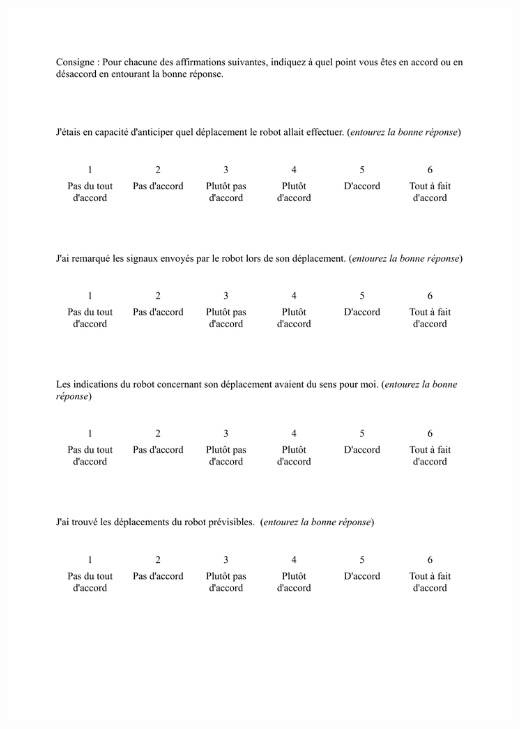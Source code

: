 \begin{center}
\includegraphics[page=2, width=\textwidth]{Annexes/SAQuestionnaireFr.pdf} 
\end{center}

